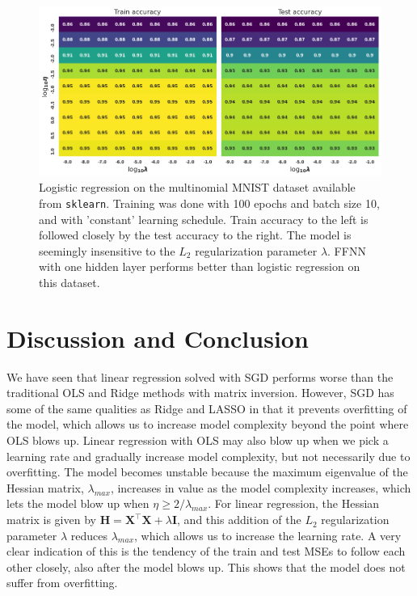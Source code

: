\documentclass[]{article}
\begin{document}
\begin{figure}[!htb]
	\centering
	\includegraphics[width=1\linewidth]{log_digits.png}
	\caption{Logistic regression on the multinomial MNIST dataset available from \lstinline|sklearn|. Training was done with 100 epochs and batch size 10, and with 'constant' learning schedule. Train accuracy to the left is followed closely by the test accuracy to the right. The model is seemingly insensitive to the $L_2$ regularization parameter $\lambda$. FFNN with one hidden layer performs better than logistic regression on this dataset.}
	\label{fig:log_digits}
\end{figure}


\clearpage
\section{Discussion and Conclusion} \label{conclusion}

We have seen that linear regression solved with SGD performs worse than the traditional OLS and Ridge methods with matrix inversion. However, SGD has some of the same qualities as Ridge and LASSO in that it prevents overfitting of the model, which allows us to increase model complexity beyond the point where OLS blows up. Linear regression with OLS may also blow up when we pick a learning rate and gradually increase model complexity, but not necessarily due to overfitting. The model becomes unstable because the maximum eigenvalue of the Hessian matrix, $\lambda_{max}$, increases in value as the model complexity increases, which lets the model blow up when $\eta \ge 2/\lambda_{max}$. For linear regression, the Hessian matrix is given by $\mathbf{H} = \mathbf{X}^\intercal \mathbf{X} + \lambda \mathbf{I}$, and this addition of the $L_2$ regularization parameter $\lambda$ reduces $\lambda_{max}$, which allows us to increase the learning rate. A very clear indication of this is the tendency of the train and test MSEs to follow each other closely, also after the model blows up. This shows that the model does not suffer from overfitting.
\end{document}
